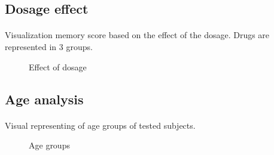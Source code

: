 \documentclass{article}
\begin{document}
    \subsection{Dosage effect}
    \paragraph{}
    Visualization memory score based on the effect of the dosage.
    Drugs are represented in 3 groups.
    \begin{figure}[!htb]
        \caption{\label{fig:dossage-effect} Effect of dosage}
    \end{figure}
    \subsection{Age analysis}
    \paragraph{}
    Visual representing of age groups of tested subjects.
    \begin{figure}[!htb]
        \caption{\label{fig:age-groups-general-view} Age groups}
    \end{figure}
\end{document}
